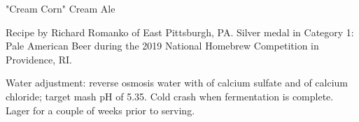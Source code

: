 \begin{recipe}{"Cream Corn" Cream Ale} %

\begin{aboutblock}
Recipe by Richard Romanko of East Pittsburgh, PA. Silver medal in Category
1: Pale American Beer during the 2019 National Homebrew Competition
in Providence, RI. \sourceaha
\end{aboutblock}
 

\begin{methodandtiming}
 
\begin{mashsteps}
\end{mashsteps}

\begin{directions}
Water adjustment: reverse osmosis water with  of calcium sulfate
and  of calcium chloride; target mash pH of 5.35. Cold crash when
fermentation is complete. Lager for a couple of weeks prior to serving.
\end{directions}

\end{methodandtiming}

\recipebreak

\begin{ingredientsblock}

\begin{malts}
\end{malts}

\begin{hops}
\end{hops}


\end{ingredientsblock}

\end{recipe}

